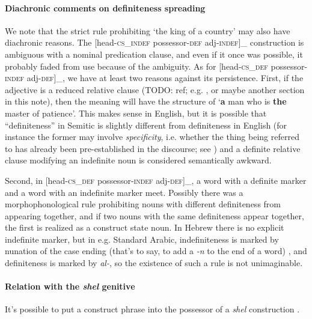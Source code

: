 \documentclass[a4paper, oneside, 12pt]{report}
\newcommand{\form}[1]{\emph{#1}}
\newcommand{\category}[1]{\textsc{#1}}
\newcommand{\translate}[1]{`#1'}
\begin{document}
\paragraph*{Diachronic comments on definiteness spreading}
We note that the strict rule prohibiting \translate{the king of a country}
may also have diachronic reasons.
The [head-\category{cs}_{\category{indef}} possessor-\category{def} adj-\category{indef}]_{} construction is ambiguous with a nominal predication clause,
and even if it once was possible,
it probably faded from use because of the ambiguity.
As for [head-\category{cs}_{\category{def}} possessor-\category{indef} adj-\category{def}]_{},
we have at least two reasons against its persistence.
First, if the adjective is a reduced relative clause (TODO: ref; e.g. \citet{cinque2010syntax}, or maybe another section in this note),
then the meaning will have the structure of \translate{\textbf{a} man who is \textbf{the} master of patience}.
This makes sense in English,
but it is possible that ``definiteness'' in Semitic is slightly different from definiteness in English
(for instance the former may involve \emph{specificity}, i.e. whether the thing being referred to has already been pre-established in the discourse;
see \citet{ihsane2001specific})
and a definite relative clause modifying an indefinite noun is considered semantically awkward.

Second, in [head-\category{cs}_{\category{def}} possessor-\category{indef} adj-\category{def}]_{}, 
a word with a definite marker and a word with an indefinite marker meet.
Possibly there was a morphophonological rule 
prohibiting nouns with different definiteness from appearing together,
and if two nouns with the same definiteness appear together,
the first is realized as a construct state noun.
In Hebrew there is no explicit indefinite marker,
but in e.g. Standard Arabic, indefiniteness is marked by nunation of the case ending 
(that's to say, to add a \form{-n} to the end of a word) ,
and definiteness is marked by \form{al-},
so the existence of such a rule is not unimaginable.

\paragraph*{Relation with the \form{shel} genitive}

It's possible to put a construct phrase into the possessor of a \form{shel} construction
\citep{alexiadou2005possessors}.
\end{document}
